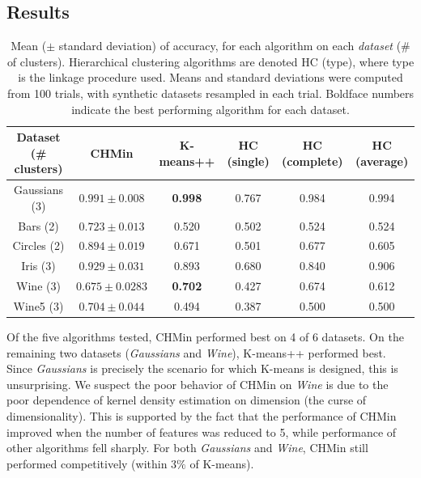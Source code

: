 \documentclass{article} %
\begin{document}
\subsection{Results}
\begin{table}
\small
\centering
\begin{tabular}{c|c|c|c|c|c}
Dataset (\# clusters)   & CHMin                         & K-means++     & HC (single)   & HC (complete) & HC (average)  \\
\hline
Gaussians (3)           & $0.991 \pm 0.008$             & {\bf 0.998}   & 0.767         & 0.984         & 0.994         \\
Bars (2)                & $\mathbf{0.723} \pm 0.013$    & 0.520         & 0.502         & 0.524         & 0.524         \\
Circles (2)             & $\mathbf{0.894} \pm 0.019$    & 0.671         & 0.501         & 0.677         & 0.605         \\
Iris (3)                & $\mathbf{0.929} \pm 0.031$    & 0.893         & 0.680         & 0.840         & 0.906         \\
Wine (3)                & $0.675 \pm 0.0283$            & {\bf 0.702}   & 0.427         & 0.674         & 0.612         \\
Wine5 (3)               & $\mathbf{0.704} \pm 0.044$    & 0.494         & 0.387         & 0.500         & 0.500
\end{tabular}
\caption{Mean ($\pm$ standard deviation) of accuracy, for each algorithm on
each \emph{dataset} (\# of clusters). Hierarchical clustering algorithms are
denoted HC (type), where type is the linkage procedure used. Means and standard
deviations were computed from 100 trials, with synthetic datasets resampled in
each trial. Boldface numbers indicate the best performing algorithm for each
dataset.}
\label{tab:results}
\end{table}

Of the five algorithms tested, CHMin performed best on 4 of 6 datasets. On
the remaining two datasets (\emph{Gaussians} and \emph{Wine}), K-means++
performed best. Since \emph{Gaussians} is precisely the scenario for which
K-means is designed, this is unsurprising. We suspect the poor behavior of
CHMin on \emph{Wine} is due to the poor dependence of kernel density estimation
on dimension (the curse of dimensionality). This is supported by the fact that
the performance of CHMin improved when the number of features was reduced to 5,
while performance of other algorithms fell sharply. For both \emph{Gaussians}
and \emph{Wine}, CHMin still performed competitively (within $3\%$ of K-means).
\end{document}

